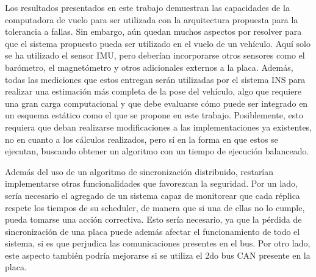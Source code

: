 Los resultados presentados en este trabajo demuestran las capacidades de la computadora de vuelo para ser utilizada con la arquitectura propuesta para la tolerancia a fallas. Sin embargo, aún quedan muchos aspectos por resolver para que el sistema propuesto pueda ser utilizado en el vuelo de un vehículo. Aquí solo se ha utilizado el sensor IMU, pero deberían incorporarse otros sensores como el barómetro, el magnetómetro y otros adicionales externos a la placa. Además, todas las mediciones que estos entregan serán utilizadas por el sistema INS para realizar una estimación más completa de la pose del vehículo, algo que requiere una gran carga computacional y que debe evaluarse cómo puede ser integrado en un esquema estático como el que se propone en este trabajo. Posiblemente, esto requiera que deban realizarse modificaciones a las implementaciones ya existentes, no en cuanto a los cálculos realizados, pero sí en la forma en que estos se ejecutan, buscando obtener un algoritmo con un tiempo de ejecución balanceado. 

Además del uso de un algoritmo de sincronización distribuido, restarían implementarse otras funcionalidades que favorezcan la seguridad. Por un lado, sería necesario el agregado de un sistema capaz de monitorear que cada réplica respete los tiempos de su scheduler, de manera que si una de ellas no lo cumple, pueda tomarse una acción correctiva. Esto sería necesario, ya que la pérdida de sincronización de una placa puede además afectar el funcionamiento de todo el sistema, si es que perjudica las comunicaciones presentes en el bus. Por otro lado, este aspecto también podría mejorarse si se utiliza el 2do bus CAN presente en la placa.